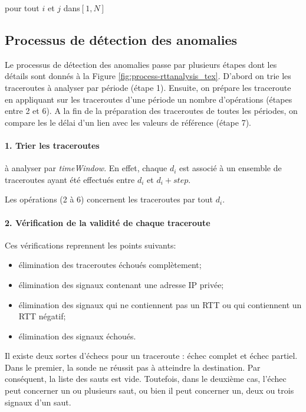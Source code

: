  pour tout $ i $ et $ j $ dans$  [1,N] $
\subsection{Processus de  détection des anomalies }\label{steps-rtt-analysis}

Le processus de  détection des anomalies passe par plusieurs étapes dont les détails sont donnés à la Figure \ref{fig:process-rttanalysis_tex}. D'abord on  trie les traceroutes à analyser par période (étape 1). Ensuite, on prépare les traceroute en    appliquant sur les traceroutes d'une période un nombre d'opérations (étapes entre 2 et 6). A la fin de la préparation des traceroutes de toutes les périodes, on compare les le délai d'un lien avec les valeurs de référence (étape 7).
\paragraph{1. Trier les traceroutes } à analyser par \textit{timeWindow}. En effet, chaque $d_i$ est associé à un ensemble de traceroutes ayant été effectués entre $d_i$ et $d_i + step$. 




Les opérations  (2 à 6) concernent  les traceroutes par tout $d_i$.  

\paragraph{2. Vérification de la validité de chaque traceroute} Ces vérifications reprennent les points suivants:
\begin{itemize}
	\item élimination des traceroutes échoués complètement;
	\item élimination des signaux contenant une adresse IP privée;
	\item élimination des signaux qui ne contiennent pas un RTT ou  qui contiennent un RTT négatif;
	\item  élimination des signaux échoués.
\end{itemize}

Il existe deux sortes d'échecs pour un traceroute : échec complet et échec partiel. Dans le premier,   la sonde ne réussit pas à atteindre la destination. Par conséquent, la liste des sauts est vide. Toutefois, dans le deuxième cas, l'échec peut concerner un ou plusieurs saut, ou bien il peut concerner un, deux ou trois signaux d'un saut.



